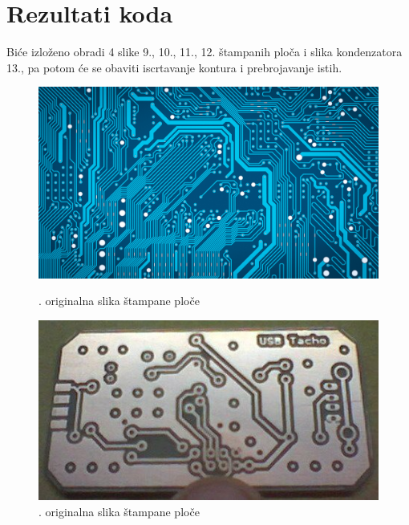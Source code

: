 \documentclass[fontsize=12bp, paper=a4]{scrarticle}
\begin{document}
\section{Rezultati koda}
Biće izloženo obradi 4 slike 9., 10., 11., 12. štampanih ploča i slika kondenzatora 13., pa potom će se obaviti iscrtavanje kontura i prebrojavanje istih.
\begin{figure}[hbp!]
    \centering
    \begin{minipage}[b]{0.2\textwidth}
        \includegraphics[width=1\textwidth]{u1.png}
        \caption{. originalna slika štampane ploče}
    \end{minipage}
    \begin{minipage}[b]{0.2\textwidth}
        \includegraphics[width=1\textwidth]{u2.png}
        \caption{. originalna slika štampane ploče}
    \end{minipage}
    \begin{minipage}[b]{0.2\textwidth}

\end{minipage}
\end{figure}
\end{document}

